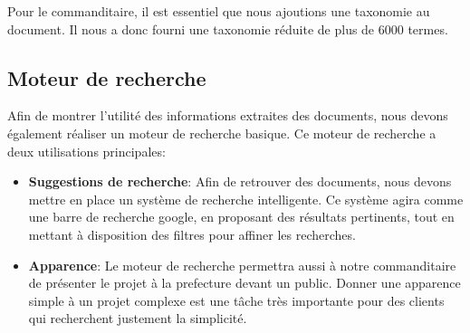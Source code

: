 Pour le commanditaire, il est essentiel que nous ajoutions une taxonomie au document.
Il nous a donc fourni une taxonomie réduite de plus de 6000 termes.


\subsection{Moteur de recherche}
Afin de montrer l'utilité des informations extraites des documents, nous devons également réaliser un moteur de recherche basique.
Ce moteur de recherche a deux utilisations principales: 
\begin{itemize}
\item \textbf{Suggestions de recherche}:\newline
Afin de retrouver des documents, nous devons mettre en place un système de recherche intelligente.
Ce système agira comme une barre de recherche google, en proposant des résultats pertinents, tout en mettant à disposition des filtres pour affiner les recherches.

\item \textbf{Apparence}:\newline
Le moteur de recherche permettra aussi à notre commanditaire de présenter le projet à la prefecture devant un public.
Donner une apparence simple à un projet complexe est une tâche très importante pour des clients qui recherchent justement la simplicité.
\end{itemize}

